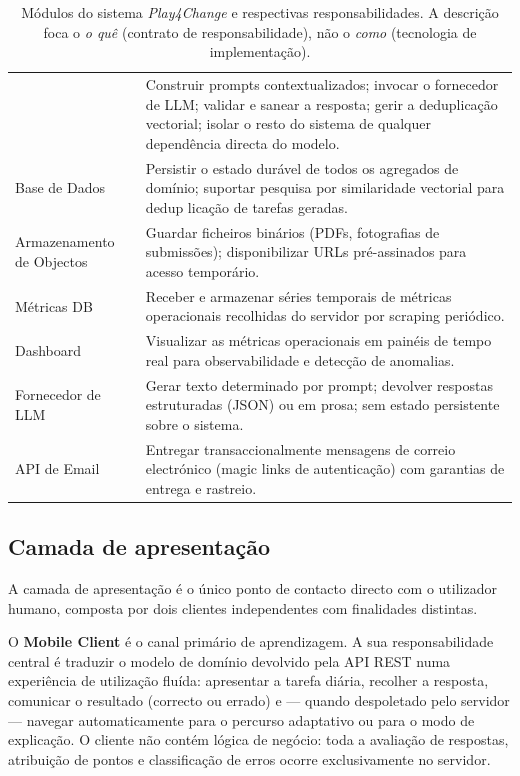 \begin{table}[htbp]
\begin{tabular}{p{3.0cm} p{9.5cm}}
			& Construir prompts contextualizados; invocar o fornecedor de LLM;
			  validar e sanear a resposta; gerir a deduplica\c{c}\~ao vectorial;
			  isolar o resto do sistema de qualquer depend\^encia directa do modelo. \\
		\addlinespace
		Base de Dados
			& Persistir o estado dur\'avel de todos os agregados de dom\'inio;
			  suportar pesquisa por similaridade vectorial para dedup lica\c{c}\~ao de
			  tarefas geradas. \\
		\addlinespace
		Armazenamento de Objectos
			& Guardar ficheiros bin\'arios (PDFs, fotografias de submiss\~oes);
			  disponibilizar URLs pr\'e-assinados para acesso tempor\'ario. \\
		\addlinespace
		M\'etricas DB
			& Receber e armazenar s\'eries temporais de m\'etricas operacionais
			  recolhidas do servidor por scraping peri\'odico. \\
		\addlinespace
		Dashboard
			& Visualizar as m\'etricas operacionais em pain\'eis de tempo real para
			  observabilidade e detec\c{c}\~ao de anomalias. \\
		\addlinespace
		Fornecedor de LLM
			& Gerar texto determinado por prompt; devolver respostas estruturadas
			  (JSON) ou em prosa; sem estado persistente sobre o sistema. \\
		\addlinespace
		API de Email
			& Entregar transaccionalmente mensagens de correio electr\'onico
			  (magic links de autentica\c{c}\~ao) com garantias de entrega e rastreio. \\
		\bottomrule
	\end{tabular}
	\caption[M\'odulos do sistema e respectivas responsabilidades]{M\'odulos do sistema \emph{Play4Change} e respectivas responsabilidades. A descri\c{c}\~ao foca o \emph{o qu\^e} (contrato de responsabilidade), n\~ao o \emph{como} (tecnologia de implementa\c{c}\~ao).}
	\label{tab:modulos-responsabilidades}
\end{table}

\subsection{Camada de apresenta\c{c}\~ao}
\label{ssec:apresentacao}

A camada de apresenta\c{c}\~ao \'e o \'unico ponto de contacto directo com o
utilizador humano, composta por dois clientes independentes com finalidades
distintas.

O \textbf{Mobile Client} \'e o canal prim\'ario de aprendizagem. A sua
responsabilidade central \'e traduzir o modelo de dom\'inio devolvido pela
API REST numa experi\^encia de utiliza\c{c}\~ao flu\'ida: apresentar a tarefa
di\'aria, recolher a resposta, comunicar o resultado (correcto ou errado) e ---
quando despoletado pelo servidor --- navegar automaticamente para o percurso
adaptativo ou para o modo de explica\c{c}\~ao. O cliente n\~ao cont\'em
l\'ogica de neg\'ocio: toda a avalia\c{c}\~ao de respostas, atribui\c{c}\~ao
de pontos e classifica\c{c}\~ao de erros ocorre exclusivamente no servidor.

